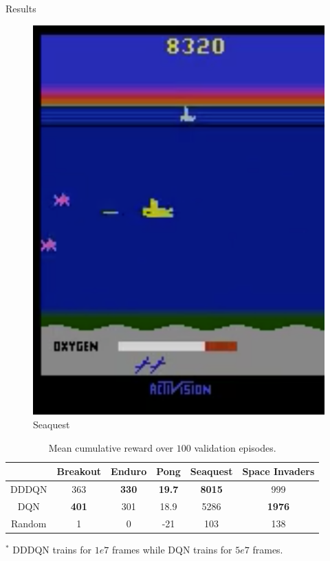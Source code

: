 \documentclass{beamer}
\begin{document}
\begin{frame}{Results}
\begin{minipage}[t]{\textwidth}
\begin{minipage}{0.3\textwidth}
\begin{figure}
    \includegraphics[height=0.35\textheight]{img/Seaquest}
    \caption*{Seaquest}
    \end{figure}
    \end{minipage}
\end{minipage}

\begin{minipage}[t]{\textwidth}
    \begin{table}
    \caption{Mean cumulative reward over $100$ validation episodes.}
    \begin{threeparttable}
        \begin{tabular}{||c c c c c c||}
        \hline
        & Breakout & Enduro & Pong & Seaquest & Space Invaders \\ [0.5ex]
        \hline\hline
        DDDQN & 363 & \textbf{330} & \textbf{19.7} & \textbf{8015} & 999 \\
        \hline
        DQN & \textbf{401} & 301 & 18.9 & 5286 & \textbf{1976} \\
        \hline
        Random & 1 & 0 & -21 & 103 & 138 \\
        \hline
        \end{tabular}
    \begin{tablenotes}
        \small
        \item $^*$ DDDQN trains for $1e7$ frames while DQN trains for $5e7$ frames.
    \end{tablenotes}
    \end{threeparttable}
    \end{table}
\end{minipage}


\end{frame}
\end{document}
